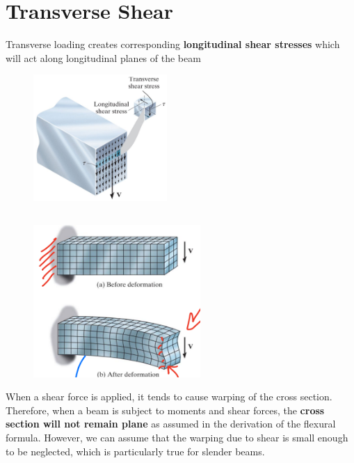 \section{Transverse Shear}

Transverse loading creates corresponding \textbf{longitudinal shear stresses} which will act along longitudinal planes of the beam

\begin{figure}[!h]
\centering
\includegraphics[angle=0, width=2in]{TransverseShear-Figures/TransToLong.png}
\vspace{-2mm}
\caption{\small {}}
\vspace{-3mm}
\label{Fig:TransToLong}
\end{figure}

\subsection{}

\begin{figure}[!h]
\centering
\includegraphics[angle=0, width=2.5in]{TransverseShear-Figures/TransverseShear.png}
\vspace{-2mm}
\caption{\small {}}
\vspace{-3mm}
\label{Fig:MaxStress}
\end{figure}

\noindent When a shear force is applied, it tends to cause warping of the cross section. Therefore, when a beam is subject to moments and shear forces, the \textbf{cross section will not remain plane} as assumed in the derivation of the flexural formula. However, we can assume that the warping due to shear is small enough to be neglected, which is particularly true for slender beams.

